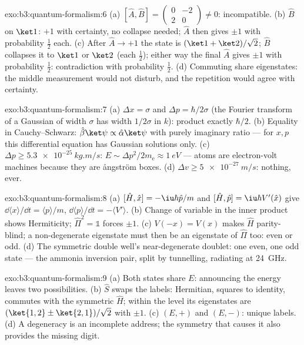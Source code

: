 \begin{solution}{exo:b3:quantum-formalism:6}
(a) $[\hat A, \hat B] = \begin{pmatrix}0 & -2\\ 2 & 0\end{pmatrix}
\neq 0$: incompatible. (b) $\hat B$ on $\ket1$: $+1$ with
certainty, no collapse needed; $\hat A$ then gives $\pm1$ with
probability $\tfrac12$ each. (c) After $\hat A \to +1$ the state is
$(\ket1 + \ket2)/\sqrt2$; $\hat B$ collapses it to $\ket1$ or
$\ket2$ (each $\tfrac12$); either way the final $\hat A$ gives
$\pm1$ with probability $\tfrac12$: contradiction with probability
$\tfrac12$. (d) Commuting  share eigenstates: the middle
measurement would not disturb, and the repetition would agree with
certainty.
\end{solution}

\begin{solution}{exo:b3:quantum-formalism:7}
(a) $\Delta x = \sigma$ and $\Delta p = \hbar/2\sigma$ (the Fourier
transform of a Gaussian of width $\sigma$ has width $1/2\sigma$ in
$k$): product exactly $\hbar/2$. (b) Equality in Cauchy--Schwarz:
$\hat\beta\ket\psi \propto \hat\alpha\ket\psi$ with purely imaginary
ratio --- for $x, p$ this differential equation has Gaussian
solutions only. (c) $\Delta p \ge \qty{5.3e-25}{kg.m/s}$: $E \sim
\Delta p^2/2m_{\text{e}} \approx \qty{1}{eV}$ --- atoms are
electron-volt machines because they are \aa ngstr\"om boxes. (d)
$\Delta v \ge \qty{5e-27}{m/s}$: nothing, ever.
\end{solution}

\begin{solution}{exo:b3:quantum-formalism:8}
(a) $[\hat H, \hat x] = -\iu\hbar\hat p/m$ and $[\hat H, \hat p] =
\iu\hbar V'(\hat x)$ give $\dd\langle x\rangle/\dd t = \langle
p\rangle/m$, $\dd\langle p\rangle/\dd t = -\langle V'\rangle$. (b)
Change of variable in the inner product shows Hermiticity;
$\hat\Pi^2 = \mathbb 1$ forces  $\pm1$. (c) $V(-x) =
V(x)$ makes $\hat H$ parity-blind; a non-degenerate eigenstate must
then be an eigenstate of $\hat\Pi$ too: even or odd. (d) The
symmetric double well's near-degenerate doublet: one even, one odd
state --- the ammonia inversion pair, split by tunnelling, radiating
at \qty{24}{GHz}.
\end{solution}

\begin{solution}{exo:b3:quantum-formalism:9}
(a) Both states share $E$: announcing the energy leaves two
possibilities. (b) $\hat S$ swaps the labels: Hermitian, squares to
identity, commutes with the symmetric $\hat H$; within the level its
eigenstates are $(\ket{1,2} \pm \ket{2,1})/\sqrt2$ with 
$\pm1$. (c) $(E, +)$ and $(E, -)$: unique labels. (d) A degeneracy
is an incomplete address; the symmetry that causes it also provides
the missing digit.
\end{solution}

